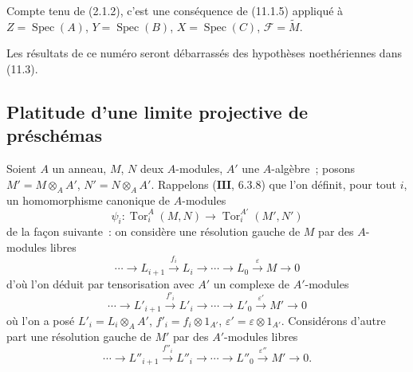 Compte tenu de (2.1.2), c'est une conséquence de (11.1.5) appliqué à
$Z=\operatorname{Spec}(A)$, $Y=\operatorname{Spec}(B)$,
$X=\operatorname{Spec}(C)$, $\mathcal F=\widetilde M$.

Les résultats de ce numéro seront débarrassés des hypothèses noethériennes
dans (11.3).

\subsection{Platitude d'une limite projective de préschémas}
\label{subsection:IV.11.2-fr}

\begin{env}[11.2.1]
\label{IV.11.2.1-fr}
Soient $A$ un anneau, $M$, $N$ deux $A$-modules, $A'$ une $A$-algèbre~;
posons $M'=M\otimes_AA'$, $N'=N\otimes_AA'$. Rappelons
($\mathbf{III}$, 6.3.8) que l'on définit, pour tout $i$, un homomorphisme
canonique de $A$-modules
\begin{equation}
\psi_i:\operatorname{Tor}_i^A(M,N)\to\operatorname{Tor}_i^{A'}(M',N')
\label{IV.11.2.1.1-fr}
\tag{11.2.1.1}
\end{equation}
de la façon suivante~: on considère une résolution gauche de $M$ par des
$A$-modules libres
\begin{equation}
\cdots\longrightarrow L_{i+1}\xrightarrow{f_i}L_i\longrightarrow\cdots
\longrightarrow L_0\xrightarrow{\varepsilon}M\longrightarrow0
\label{IV.11.2.1.2-fr}
\tag{11.2.1.2}
\end{equation}
d'où l'on déduit par tensorisation avec $A'$ un complexe de $A'$-modules
\begin{equation}
\cdots\longrightarrow L'_{i+1}\xrightarrow{f'_i}L'_i\longrightarrow\cdots
\longrightarrow L'_0\xrightarrow{\varepsilon'}M'\longrightarrow0
\label{IV.11.2.1.3-fr}
\tag{11.2.1.3}
\end{equation}
où l'on a posé $L'_i=L_i\otimes_AA'$, $f'_i=f_i\otimes1_{A'}$,
$\varepsilon'=\varepsilon\otimes1_{A'}$. Considérons d'autre part une
résolution gauche de $M'$ par des $A'$-modules libres
\begin{equation}
\cdots\longrightarrow L''_{i+1}\xrightarrow{f''_i}L''_i\longrightarrow\cdots
\longrightarrow L''_0\xrightarrow{\varepsilon''}M'\longrightarrow0.
\label{IV.11.2.1.4-fr}
\tag{11.2.1.4}
\end{equation}
\end{env}


